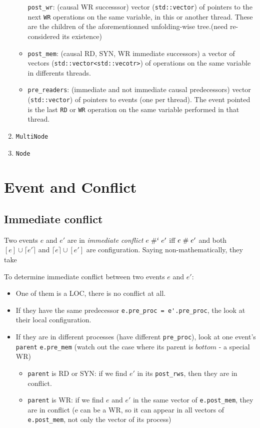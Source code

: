 \documentclass{llncs}
\begin{document}
\begin{enumerate}
\begin{itemize}
  \verb!post_wr!: (causal WR successsor) vector (\verb!std::vector!) of
  pointers to the next \verb!WR! operations on the same variable, in this
  or another thread. These are the children of the aforementionned
  unfolding-wise tree.(need re-considered its existence)
\item
  \verb!post_mem!: (causal RD, SYN, WR immediate successors) a vector of vectors (\verb!std::vector<std::vecotr>!) of operations on the same variable in differents threads. 
	
\item
  \verb!pre_readers!: (immediate and not immediate causal predecessors)
  vector (\verb!std::vector!) of pointers to events (one per thread).
  The event pointed is the last \verb!RD! or \verb!WR! operation on the
  same variable performed in that thread.
\end{itemize}

\item
	\verb!MultiNode!
\item
	\verb!Node!

\end{enumerate}

\section{Event and Conflict}
\subsection{Immediate conflict}
Two events $e$ and $e'$ are in \textit{immediate conflict} $e \mathrel{\#^i_{}} e' $ iff $e \mathrel{\#} e'$ and both $[e] \cup \lceil e' \rceil$ and $ \lceil e \rceil \cup [e']$ are configuration. Saying non-mathematically, they take 

To determine immediate conflict between two events $e$ and $e'$: 
\begin{itemize}
	\item
	One of them is a LOC, there is no conflict at all.
	\item
	If they have the same predecessor \verb!e.pre_proc = e'.pre_proc!, the look at their local configuration.
	\item
	If they are in different processes (have different \verb!pre_proc!), look at one event's \verb!parent! \verb!e.pre_mem! (watch out the case where its parent is $bottom$ - a special WR)
	\begin{itemize}
		\item
		\verb!parent! is RD or SYN: if we find $e'$ in its \verb!post_rws!, then they are in
		conflict.
		\item
		\verb!parent! is WR: if we find $e$ and $e'$ in the same vector of \verb!e.post_mem!,
		they are in conflict (e can be a WR, so it can appear in all vectors of 
		\verb!e.post_mem!, not only the vector of its process)
	\end{itemize}
	
\end{itemize}
\end{document}
